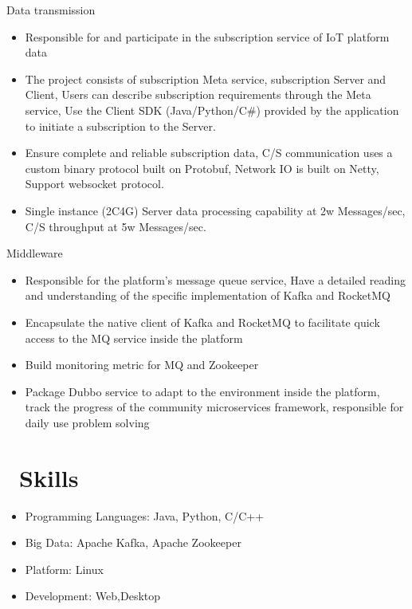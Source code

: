 \documentclass{resume}
\begin{document}
Data transmission
\begin{itemize}
    \item Responsible for and participate in the subscription service of IoT platform data
    \item The project consists of subscription Meta service, subscription Server and Client, Users can describe subscription requirements through the Meta service, Use the Client SDK (Java/Python/C\#) provided by the application to initiate a subscription to the Server.
    \item Ensure complete and reliable subscription data, C/S communication uses a custom binary protocol built on Protobuf, Network IO is built on Netty, Support websocket protocol.
    \item Single instance (2C4G) Server data processing capability at 2w Messages/sec, C/S throughput at 5w Messages/sec.
\end{itemize}

Middleware
\begin{itemize}
    \item Responsible for the platform's message queue service, Have a detailed reading and understanding of the specific implementation of Kafka and RocketMQ
    \item Encapsulate the native client of Kafka and RocketMQ to facilitate quick access to the MQ service inside the platform
    \item Build monitoring metric for MQ and Zookeeper
    \item Package Dubbo service to adapt to the environment inside the platform, track the progress of the community microservices framework, responsible for daily use problem solving
\end{itemize}

\section{\faCogs\ Skills}
\begin{itemize}[parsep=0.5ex]
  \item Programming Languages: Java, Python, C/C++
  \item Big Data: Apache Kafka, Apache Zookeeper
  \item Platform: Linux
  \item Development: Web,Desktop
\end{itemize}
\end{document}
